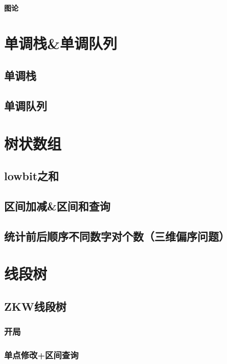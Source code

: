 \documentclass{article}
\begin{document}
\begin{titlepage}

\thispagestyle{empty}
\pagebreak
\textbf{图论}
\pagestyle{plain}
\tableofcontents
\end{titlepage}


\hspace{3em}
\section{﻿单调栈&单调队列}
\subsection{单调栈}

\subsection{单调队列}


\section{树状数组}
\subsection{lowbit之和}

\subsection{区间加减&区间和查询}

\subsection{统计前后顺序不同数字对个数（三维偏序问题）}


\section{线段树}
\subsection{ZKW线段树}
\subsubsection{开局}

\subsubsection{单点修改+区间查询}

\end{document}
